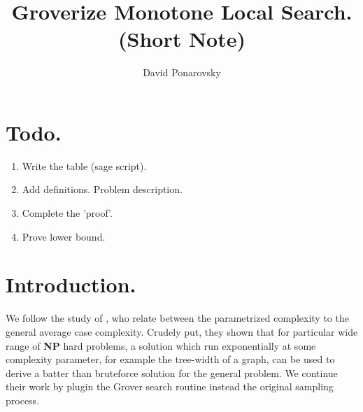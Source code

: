 \documentclass[manuscript,screen,review]{acmart}
\begin{document}


\title{Groverize Monotone Local Search. (Short Note)} 
\author{David Ponarovsky}

\ifdefined\ACM
\else
  \maketitle
\fi
%
\ifdefined\ACM
  \maketitle
\fi

% 
%

\section{Todo.}
\begin{enumerate}
  \item Write the table (sage script).
  \item Add definitions. Problem description.  
  \item Complete the 'proof'. 
  \item Prove lower bound. 
\end{enumerate}

\section{Introduction.} We follow the study of \cite{fomin2015exact}, who relate between the parametrized complexity to the general average case complexity. Crudely put, they shown that for particular wide range of \textbf{NP} hard problems, a solution which run exponentially at some complexity parameter, for example the tree-width of a graph, can be used to derive a batter than bruteforce solution for the general problem. We continue their work by plugin the Grover search   \cite{grover1996fast} routine instead the original sampling process.   

\newcommand{\Oh}{{\mathcal{O}}}
\newcommand{\bitsize}{N}
\newcommand{\longversion}[1]{#1}
\newcommand{\abpartization}{{\sc Vertex $(r,\ell)$-Partization}}
\end{document}
